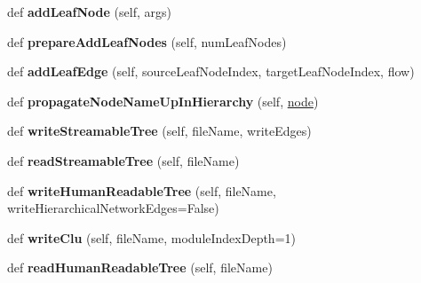 \begin{DoxyCompactItemize}
def {\bfseries add\+Leaf\+Node} (self, args)
\item 
\mbox{\label{classinfomap_1_1HierarchicalNetwork_adb99c682dbf1717156360fd83cb3ed79}} 
def {\bfseries prepare\+Add\+Leaf\+Nodes} (self, num\+Leaf\+Nodes)
\item 
\mbox{\label{classinfomap_1_1HierarchicalNetwork_a9a64cf85679e56fa3a685ea61ae35ed2}} 
def {\bfseries add\+Leaf\+Edge} (self, source\+Leaf\+Node\+Index, target\+Leaf\+Node\+Index, flow)
\item 
\mbox{\label{classinfomap_1_1HierarchicalNetwork_a0a98f23bdbbf958e98d703e4d01128c8}} 
def {\bfseries propagate\+Node\+Name\+Up\+In\+Hierarchy} (self, \mbox{\hyperlink{structnode}{node}})
\item 
\mbox{\label{classinfomap_1_1HierarchicalNetwork_a5a88d05de3884d0e4129fc1631ddd971}} 
def {\bfseries write\+Streamable\+Tree} (self, file\+Name, write\+Edges)
\item 
\mbox{\label{classinfomap_1_1HierarchicalNetwork_a5d26849845d3b47e3bcb6dac2a8d83c5}} 
def {\bfseries read\+Streamable\+Tree} (self, file\+Name)
\item 
\mbox{\label{classinfomap_1_1HierarchicalNetwork_a97b2976360e9976b468fa60ded228247}} 
def {\bfseries write\+Human\+Readable\+Tree} (self, file\+Name, write\+Hierarchical\+Network\+Edges=False)
\item 
\mbox{\label{classinfomap_1_1HierarchicalNetwork_a478cfc383128a59b014095c798fedbd9}} 
def {\bfseries write\+Clu} (self, file\+Name, module\+Index\+Depth=1)
\item 
\mbox{\label{classinfomap_1_1HierarchicalNetwork_a69e760f325035755fb9d6a3160b9e201}} 
def {\bfseries read\+Human\+Readable\+Tree} (self, file\+Name)
\item 
\mbox{\label{classinfomap_1_1HierarchicalNetwork_ab7a6ba40a84d820289e4a56438b9d6ef}} 

\end{DoxyCompactItemize}
